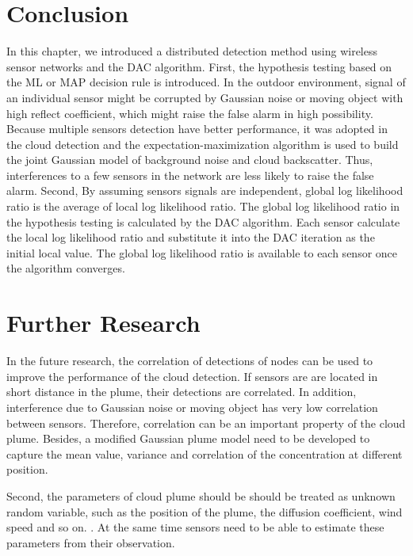 \section{Conclusion}



In this chapter, we introduced a distributed detection method using
wireless sensor networks and the DAC algorithm. First, the hypothesis
testing based on the ML or MAP decision rule is introduced. In the
outdoor environment, signal of an individual sensor might be corrupted
by Gaussian noise or moving object with high reflect coefficient,
which might raise the false alarm in high possibility. Because multiple
sensors detection have better performance, it was adopted in the cloud
detection and the expectation-maximization algorithm is used to build
the joint Gaussian model of background noise and cloud backscatter.
Thus, interferences to a few sensors in the network are less likely
to raise the false alarm. Second, By assuming sensors signals are
independent, global log likelihood ratio is the average of local log
likelihood ratio. The global log likelihood ratio in the hypothesis
testing is calculated by the DAC algorithm. Each sensor calculate
the local log likelihood ratio and substitute it into the DAC iteration
as the initial local value. The global log likelihood ratio is available
to each sensor once the algorithm converges. 


\section{Further Research}

In the future research, the correlation of detections of nodes can
be used to improve the performance of the cloud detection.  If sensors
are are located in short distance in the plume, their detections are
correlated. In addition, interference due to Gaussian noise or moving
object has very low correlation between sensors. Therefore, correlation
can be an important property of the cloud plume. Besides, a modified
Gaussian plume model need to be developed to capture the mean value,
variance and correlation of the concentration at different position. 

Second, the parameters of cloud plume should be should be treated
as unknown random variable, such as the position of the plume, the
diffusion coefficient, wind speed and so on. .  At the same time sensors
need to be able to estimate these parameters from their observation.
 
